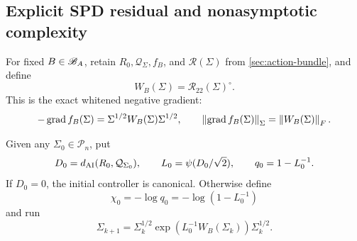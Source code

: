 \subsection{Explicit SPD residual and nonasymptotic complexity}

For fixed \(B\in\mathscr B_A\), retain \(R_0,\mathcal Q_\Sigma,f_B\), and
\(\mathcal R(\Sigma)\) from \cref{sec:action-bundle}, and define
\begin{equation}
  W_B(\Sigma)=\mathcal R_{22}(\Sigma)^\circ.
  \label{eq:solver-residual}
\end{equation}
This is the exact whitened negative gradient:
\begin{equation}
  -\operatorname{grad}f_B(\Sigma)
  =\Sigma^{1/2}W_B(\Sigma)\Sigma^{1/2},
  \qquad
  \left\lVert \operatorname{grad}f_B(\Sigma)\right\rVert_\Sigma
  =\left\lVert W_B(\Sigma)\right\rVert_F.
  \label{eq:residual-gradient-identity}
\end{equation}

Given any \(\Sigma_0\in\mathscr P_n\), put
\begin{equation}
  D_0=d_{\mathrm{AI}}(R_0,\mathcal Q_{\Sigma_0}),
  \qquad
  L_0=\psi(D_0/\sqrt2),
  \qquad
  q_0=1-L_0^{-1}.
  \label{eq:solver-constants}
\end{equation}
If \(D_0=0\), the initial controller is canonical.  Otherwise define
\begin{equation}
  \chi_0=-\log q_0
  =-\log(1-L_0^{-1})
  \label{eq:solver-discrete-exponent}
\end{equation}
and run
\begin{equation}
  \boxed{
  \Sigma_{k+1}
  =\Sigma_k^{1/2}
   \exp\!\left(L_0^{-1}W_B(\Sigma_k)\right)
   \Sigma_k^{1/2}.}
  \label{eq:certified-solver-update}
\end{equation}

